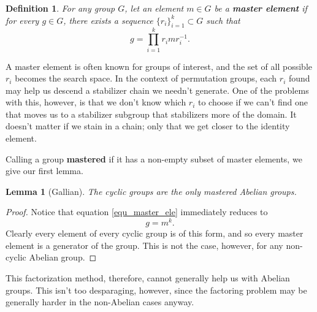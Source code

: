 \documentclass[12pt]{article}
\newtheorem{definition}{Definition}[section]
\newtheorem{lemma}{Lemma}[section]
\begin{document}
\begin{definition}
For any group $G$, let an element $m\in G$ be a \textbf{master element} if for
every $g\in G$, there exists a sequence $\{r_i\}_{i=1}^k\subset G$ such that
\begin{equation}\label{equ_master_ele}
g = \prod_{i=1}^k r_imr_i^{-1}.
\end{equation}
\end{definition}

A master element is often known for groups of interest, and the set of all
possible $r_i$ becomes the search space.  In the context of permutation groups,
each $r_i$ found may help us descend a stabilizer chain we needn't generate.
One of the problems with this, however, is that we don't know which $r_i$ to choose
if we can't find one that moves us to a stabilizer subgroup that stabilizers more
of the domain.  It doesn't matter if we stain in a chain; only that we get closer
to the identity element.

Calling a group \textbf{mastered} if it has a non-empty subset of master elements,
we give our first lemma.

\begin{lemma}[Gallian]
The cyclic groups are the only mastered Abelian groups.
\end{lemma}
\begin{proof}
Notice that equation \eqref{equ_master_ele} immediately reduces to
\begin{equation*}
g = m^k.
\end{equation*}
Clearly every element of every cyclic group is of this
form, and so every master element is a generator of the group.
This is not the case, however, for any non-cyclic Abelian group.
\end{proof}

This factorization method, therefore, cannot generally help us with Abelian groups.
This isn't too desparaging, however, since the factoring problem may be generally
harder in the non-Abelian cases anyway.

\end{document}
